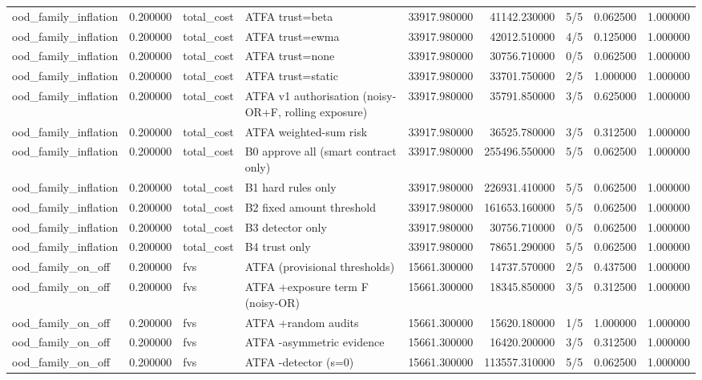 \begin{tabular}{lrllrrlrr}
ood\_family\_inflation & 0.200000 & total\_cost & ATFA trust=beta & 33917.980000 & 41142.230000 & 5/5 & 0.062500 & 1.000000 \\
ood\_family\_inflation & 0.200000 & total\_cost & ATFA trust=ewma & 33917.980000 & 42012.510000 & 4/5 & 0.125000 & 1.000000 \\
ood\_family\_inflation & 0.200000 & total\_cost & ATFA trust=none & 33917.980000 & 30756.710000 & 0/5 & 0.062500 & 1.000000 \\
ood\_family\_inflation & 0.200000 & total\_cost & ATFA trust=static & 33917.980000 & 33701.750000 & 2/5 & 1.000000 & 1.000000 \\
ood\_family\_inflation & 0.200000 & total\_cost & ATFA v1 authorisation (noisy-OR+F, rolling exposure) & 33917.980000 & 35791.850000 & 3/5 & 0.625000 & 1.000000 \\
ood\_family\_inflation & 0.200000 & total\_cost & ATFA weighted-sum risk & 33917.980000 & 36525.780000 & 3/5 & 0.312500 & 1.000000 \\
ood\_family\_inflation & 0.200000 & total\_cost & B0 approve all (smart contract only) & 33917.980000 & 255496.550000 & 5/5 & 0.062500 & 1.000000 \\
ood\_family\_inflation & 0.200000 & total\_cost & B1 hard rules only & 33917.980000 & 226931.410000 & 5/5 & 0.062500 & 1.000000 \\
ood\_family\_inflation & 0.200000 & total\_cost & B2 fixed amount threshold & 33917.980000 & 161653.160000 & 5/5 & 0.062500 & 1.000000 \\
ood\_family\_inflation & 0.200000 & total\_cost & B3 detector only & 33917.980000 & 30756.710000 & 0/5 & 0.062500 & 1.000000 \\
ood\_family\_inflation & 0.200000 & total\_cost & B4 trust only & 33917.980000 & 78651.290000 & 5/5 & 0.062500 & 1.000000 \\
ood\_family\_on\_off & 0.200000 & fvs & ATFA (provisional thresholds) & 15661.300000 & 14737.570000 & 2/5 & 0.437500 & 1.000000 \\
ood\_family\_on\_off & 0.200000 & fvs & ATFA +exposure term F (noisy-OR) & 15661.300000 & 18345.850000 & 3/5 & 0.312500 & 1.000000 \\
ood\_family\_on\_off & 0.200000 & fvs & ATFA +random audits & 15661.300000 & 15620.180000 & 1/5 & 1.000000 & 1.000000 \\
ood\_family\_on\_off & 0.200000 & fvs & ATFA -asymmetric evidence & 15661.300000 & 16420.200000 & 3/5 & 0.312500 & 1.000000 \\
ood\_family\_on\_off & 0.200000 & fvs & ATFA -detector (s=0) & 15661.300000 & 113557.310000 & 5/5 & 0.062500 & 1.000000 \\

\end{tabular}
